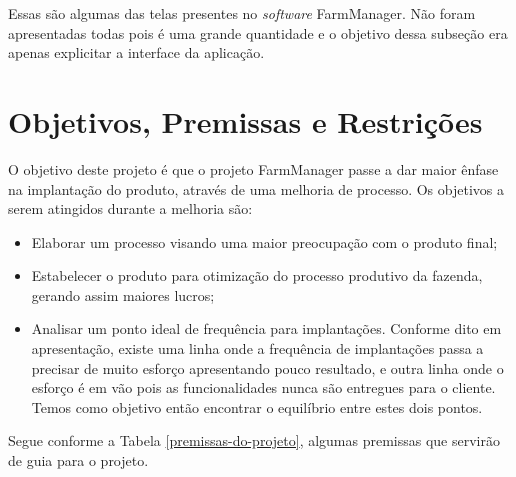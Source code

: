 Essas são algumas das telas presentes no \textit{software} FarmManager. Não foram apresentadas todas pois é uma grande quantidade e o objetivo dessa subseção era apenas explicitar a interface da aplicação.

\section{Objetivos, Premissas e Restrições}

O objetivo deste projeto é que o projeto FarmManager passe a dar maior ênfase na implantação do produto, através de uma melhoria de processo. Os objetivos a serem atingidos durante a melhoria são:

\begin{itemize}
	\item Elaborar um processo visando uma maior preocupação com o produto final;
	\item Estabelecer o produto para otimização do processo produtivo da fazenda, gerando assim maiores lucros;
	\item Analisar um ponto ideal de frequência para implantações. Conforme dito em apresentação, existe uma linha onde a frequência de implantações passa a precisar de muito esforço apresentando pouco resultado, e outra linha onde o esforço é em vão pois as funcionalidades nunca são entregues para o cliente. Temos como objetivo então encontrar o equilíbrio entre estes dois pontos.
\end{itemize}

Segue conforme a Tabela \ref{premissas-do-projeto}, algumas premissas que servirão de guia para o projeto.

